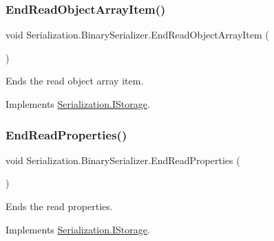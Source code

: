 \subsubsection{\texorpdfstring{End\+Read\+Object\+Array\+Item()}{EndReadObjectArrayItem()}}
{\footnotesize\ttfamily void Serialization.\+Binary\+Serializer.\+End\+Read\+Object\+Array\+Item (\begin{DoxyParamCaption}{ }\end{DoxyParamCaption})\hspace{0.3cm}{\ttfamily [inline]}}



Ends the read object array item. 



Implements \hyperlink{interface_serialization_1_1_i_storage_a0b02021d3b80d7a3b66657aca7e50683}{Serialization.\+I\+Storage}.

\mbox{\label{class_serialization_1_1_binary_serializer_af889e7729b3bf07d18a86fe32064d4c0}} 
\subsubsection{\texorpdfstring{End\+Read\+Properties()}{EndReadProperties()}}
{\footnotesize\ttfamily void Serialization.\+Binary\+Serializer.\+End\+Read\+Properties (\begin{DoxyParamCaption}{ }\end{DoxyParamCaption})\hspace{0.3cm}{\ttfamily [inline]}}



Ends the read properties. 



Implements \hyperlink{interface_serialization_1_1_i_storage_a5e3376134f3047f247eaa2a6844389f3}{Serialization.\+I\+Storage}.

\mbox{\label{class_serialization_1_1_binary_serializer_a0b50b703f7b33e2b60421611a3757716}} 
